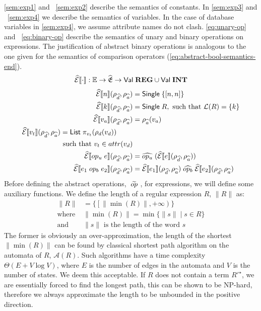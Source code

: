 \autoref{sem:exp1} and ~\ref{sem:exp2} describe the semantics of constants.
In \autoref{sem:exp3} and ~\ref{sem:exp4} we describe the semantics of variables.
In the case of database variables in \autoref{sem:exp4}, we assume attribute names do not clash.
\autoref{eq:unary-op} and ~\ref{eq:binary-op} describe the semantics of unary and binary operations on expressions.
The justification of abstract binary operations is analogous to the one given for the semantics of comparison operators (\autoref{eq:abstract-bool-semantics-end}).
\begin{align}
    \widehat{\mathcal{E}}\llbracket \cdot \rrbracket : \mathbb{E} \rightarrow \widehat{\mathfrak{E}} \rightarrow \mathsf{Val} \; \mathbf{REG} \cup \mathsf{Val} \; \mathbf{INT}
\end{align}
\begin{align}
    \absexpsem{n}(\rho_{\ab{d}}, \rho_{\ab{a}}) &= \mathsf{Single} \; \{ [n, n] \} \label{sem:exp1} \\
    \absexpsem{k}(\rho_{\ab{d}}, \rho_{\ab{a}}) &= \mathsf{Single} \; R,  \text{ such that }\mathcal{L}(R) = \{ k \} \label{sem:exp2} \\
    \absexpsem{v_a}(\rho_{\ab{d}}, \rho_{\ab{a}}) &=  \rho_{\ab{a}}(v_a) \label{sem:exp3} \\
    \begin{split}
        \absexpsem{v_t}(\rho_{\ab{d}}, \rho_{\ab{a}}) &=  \mathsf{List} \; \pi_{v_t}(\rho_d(v_d)) \\
        &\text{ such that } v_t \in attr(v_d) \label{sem:exp4}
    \end{split} \\
    \absexpsem{op_u \; e}(\rho_{\ab{d}}, \rho_{\ab{a}}) &= \ab{op_u} \; (\absexpsem{e}(\rho_{\ab{d}}, \rho_{\ab{a}})) \label{eq:unary-op} \\
    \absexpsem{e_1 \;op_b\; e_2}(\rho_{\ab{d}}, \rho_{\ab{a}}) &= \absexpsem{e_1}(\rho_{\ab{d}}, \rho_{\ab{a}}) \;\ab{op_b}\; \absexpsem{e_2}(\rho_{\ab{d}}, \rho_{\ab{a}}) \label{eq:binary-op}
\end{align}
Before defining the abstract operations, $\;\widetilde{op}\;$, for expressions, we will define some auxiliary functions.
We define the length of a regular expression $R$, $\|R\|$ as:
\begin{align}\label{eq:r1}
    \|R\| & = \{ \left[ \|\min(R)\|, +\infty \right) \} \\
    \text{where } & \|\min(R)\| = \min\{ \|s\| \mid s \in R \} \\ \label{eq:r2}
    \text{and } & \|s\| \text{ is the length of the word $s$}
\end{align}
The former is obviously an over-approximation, the length of the shortest $\|\min(R)\|$ can be found by classical shortest path algorithm on the automata of $R$, $\mathcal{A}(R)$.
Such algorithms have a time complexity $\Theta(E + V \log V)$, where $E$ is the number of edges in the automata and $V$ is the number of states.
We deem this acceptable.
If $R$ does not contain a term $R'^\star$, we are essentially forced to find the longest path, this can be shown to be NP-hard, therefore we always approximate the length to be unbounded in the positive direction.


